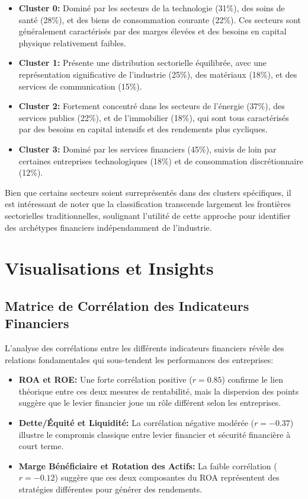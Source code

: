 \documentclass[12pt]{article}
\begin{document}
\begin{itemize}
    \item \textbf{Cluster 0:} Dominé par les secteurs de la technologie (31\%), des soins de santé (28\%), et des biens de consommation courante (22\%). Ces secteurs sont généralement caractérisés par des marges élevées et des besoins en capital physique relativement faibles.
    
    \item \textbf{Cluster 1:} Présente une distribution sectorielle équilibrée, avec une représentation significative de l'industrie (25\%), des matériaux (18\%), et des services de communication (15\%).
    
    \item \textbf{Cluster 2:} Fortement concentré dans les secteurs de l'énergie (37\%), des services publics (22\%), et de l'immobilier (18\%), qui sont tous caractérisés par des besoins en capital intensifs et des rendements plus cycliques.
    
    \item \textbf{Cluster 3:} Dominé par les services financiers (45\%), suivis de loin par certaines entreprises technologiques (18\%) et de consommation discrétionnaire (12\%).
\end{itemize}

Bien que certains secteurs soient surreprésentés dans des clusters spécifiques, il est intéressant de noter que la classification transcende largement les frontières sectorielles traditionnelles, soulignant l'utilité de cette approche pour identifier des archétypes financiers indépendamment de l'industrie.

\newpage
\section{Visualisations et Insights}
\subsection{Matrice de Corrélation des Indicateurs Financiers}
L'analyse des corrélations entre les différents indicateurs financiers révèle des relations fondamentales qui sous-tendent les performances des entreprises:

\begin{itemize}
    \item \textbf{ROA et ROE:} Une forte corrélation positive ($r = 0.85$) confirme le lien théorique entre ces deux mesures de rentabilité, mais la dispersion des points suggère que le levier financier joue un rôle différent selon les entreprises.
    
    \item \textbf{Dette/Équité et Liquidité:} La corrélation négative modérée ($r = -0.37$) illustre le compromis classique entre levier financier et sécurité financière à court terme.
    
    \item \textbf{Marge Bénéficiaire et Rotation des Actifs:} La faible corrélation ($r = -0.12$) suggère que ces deux composantes du ROA représentent des stratégies différentes pour générer des rendements.
\end{itemize}
\end{document}
